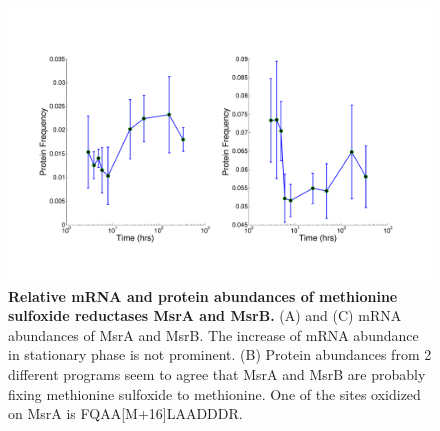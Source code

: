 \documentclass[12pt]{article}
\begin{document}
\clearpage
\begin{figure}[p]
\centerline{\includegraphics[width=8in]{Figures/Ecoli_MsrAB_MODa.pdf}}
\caption{\label{fig:MsrAB}\textbf{Relative mRNA and protein abundances of methionine sulfoxide reductases MsrA and MsrB.} (A) and (C) mRNA abundances of MsrA and MsrB. The increase of mRNA abundance in stationary phase is not prominent. (B) Protein abundances from 2 different programs seem to agree that MsrA and MsrB are probably fixing methionine sulfoxide to methionine. One of the sites oxidized on MsrA is FQAA[M+16]LAADDDR.}
\end{figure}

\bigskip
\end{document}
